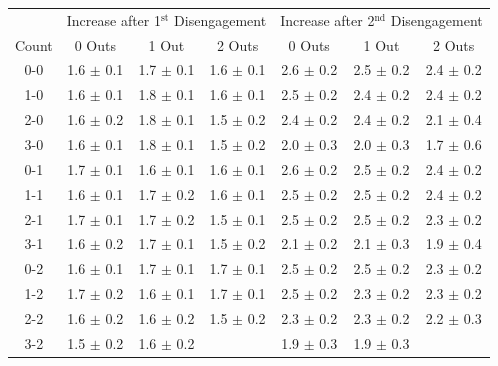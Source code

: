 \begin{tabular}{c|ccc|ccc}
& \multicolumn{3}{c}{Increase after 1$^\text{st}$ Disengagement} & \multicolumn{3}{c}{Increase after 2$^\text{nd}$ Disengagement}\\
Count & 0 Outs & 1 Out & 2 Outs & 0 Outs & 1 Out & 2 Outs \\
  \hline
0-0 & 1.6 {\color{gray}$\pm$ 0.1} & 1.7 {\color{gray}$\pm$ 0.1} & 1.6 {\color{gray}$\pm$ 0.1} & 2.6 {\color{gray}$\pm$ 0.2} & 2.5 {\color{gray}$\pm$ 0.2} & 2.4 {\color{gray}$\pm$ 0.2} \\ 
  1-0 & 1.6 {\color{gray}$\pm$ 0.1} & 1.8 {\color{gray}$\pm$ 0.1} & 1.6 {\color{gray}$\pm$ 0.1} & 2.5 {\color{gray}$\pm$ 0.2} & 2.4 {\color{gray}$\pm$ 0.2} & 2.4 {\color{gray}$\pm$ 0.2} \\ 
  2-0 & 1.6 {\color{gray}$\pm$ 0.2} & 1.8 {\color{gray}$\pm$ 0.1} & 1.5 {\color{gray}$\pm$ 0.2} & 2.4 {\color{gray}$\pm$ 0.2} & 2.4 {\color{gray}$\pm$ 0.2} & 2.1 {\color{gray}$\pm$ 0.4} \\ 
  3-0 & 1.6 {\color{gray}$\pm$ 0.1} & 1.8 {\color{gray}$\pm$ 0.1} & 1.5 {\color{gray}$\pm$ 0.2} & 2.0 {\color{gray}$\pm$ 0.3} & 2.0 {\color{gray}$\pm$ 0.3} & 1.7 {\color{gray}$\pm$ 0.6} \\ 
   \hline
0-1 & 1.7 {\color{gray}$\pm$ 0.1} & 1.6 {\color{gray}$\pm$ 0.1} & 1.6 {\color{gray}$\pm$ 0.1} & 2.6 {\color{gray}$\pm$ 0.2} & 2.5 {\color{gray}$\pm$ 0.2} & 2.4 {\color{gray}$\pm$ 0.2} \\ 
  1-1 & 1.6 {\color{gray}$\pm$ 0.1} & 1.7 {\color{gray}$\pm$ 0.2} & 1.6 {\color{gray}$\pm$ 0.1} & 2.5 {\color{gray}$\pm$ 0.2} & 2.5 {\color{gray}$\pm$ 0.2} & 2.4 {\color{gray}$\pm$ 0.2} \\ 
  2-1 & 1.7 {\color{gray}$\pm$ 0.1} & 1.7 {\color{gray}$\pm$ 0.2} & 1.5 {\color{gray}$\pm$ 0.1} & 2.5 {\color{gray}$\pm$ 0.2} & 2.5 {\color{gray}$\pm$ 0.2} & 2.3 {\color{gray}$\pm$ 0.2} \\ 
  3-1 & 1.6 {\color{gray}$\pm$ 0.2} & 1.7 {\color{gray}$\pm$ 0.1} & 1.5 {\color{gray}$\pm$ 0.2} & 2.1 {\color{gray}$\pm$ 0.2} & 2.1 {\color{gray}$\pm$ 0.3} & 1.9 {\color{gray}$\pm$ 0.4} \\ 
   \hline
0-2 & 1.6 {\color{gray}$\pm$ 0.1} & 1.7 {\color{gray}$\pm$ 0.1} & 1.7 {\color{gray}$\pm$ 0.1} & 2.5 {\color{gray}$\pm$ 0.2} & 2.5 {\color{gray}$\pm$ 0.2} & 2.3 {\color{gray}$\pm$ 0.2} \\ 
  1-2 & 1.7 {\color{gray}$\pm$ 0.2} & 1.6 {\color{gray}$\pm$ 0.1} & 1.7 {\color{gray}$\pm$ 0.1} & 2.5 {\color{gray}$\pm$ 0.2} & 2.3 {\color{gray}$\pm$ 0.2} & 2.3 {\color{gray}$\pm$ 0.2} \\ 
  2-2 & 1.6 {\color{gray}$\pm$ 0.2} & 1.6 {\color{gray}$\pm$ 0.2} & 1.5 {\color{gray}$\pm$ 0.2} & 2.3 {\color{gray}$\pm$ 0.2} & 2.3 {\color{gray}$\pm$ 0.2} & 2.2 {\color{gray}$\pm$ 0.3} \\ 
  3-2 & 1.5 {\color{gray}$\pm$ 0.2} & 1.6 {\color{gray}$\pm$ 0.2} &  & 1.9 {\color{gray}$\pm$ 0.3} & 1.9 {\color{gray}$\pm$ 0.3} &  \\ 
\end{tabular}
